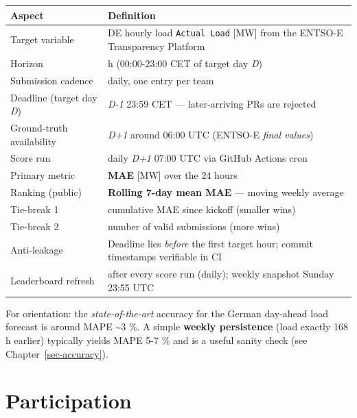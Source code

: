 \documentclass[
  english,
  letterpaper,
]{scrbook}
\newcounter{none} %
\begin{document}
{\def\LTcaptype{none} %
\begin{longtable}[]{@{}
  >{\raggedright\arraybackslash}p{}
  >{\raggedright\arraybackslash}p{}@{}}
\toprule\noalign{}
\begin{minipage}[b]{\linewidth}\raggedright
Aspect
\end{minipage} & \begin{minipage}[b]{\linewidth}\raggedright
Definition
\end{minipage} \\
\midrule\noalign{}
\endhead
\bottomrule\noalign{}
\endlastfoot
Target variable & DE hourly load \texttt{Actual\ Load} {[}MW{]} from the
ENTSO-E Transparency Platform \\
Horizon & 24 h (00:00-23:00 CET of target day \emph{D}) \\
Submission cadence & daily, one entry per team \\
Deadline (target day \emph{D}) & \emph{D-1} 23:59 CET --- later-arriving
PRs are rejected \\
Ground-truth availability & \emph{D+1} around 06:00 UTC (ENTSO-E
\emph{final values}) \\
Score run & daily \emph{D+1} 07:00 UTC via GitHub Actions cron \\
Primary metric & \textbf{MAE} {[}MW{]} over the 24 hours \\
Ranking (public) & \textbf{Rolling 7-day mean MAE} --- moving weekly
average \\
Tie-break 1 & cumulative MAE since kickoff (smaller wins) \\
Tie-break 2 & number of valid submissions (more wins) \\
Anti-leakage & Deadline lies \emph{before} the first target hour; commit
timestamps verifiable in CI \\
Leaderboard refresh & after every score run (daily); weekly snapshot
Sunday 23:55 UTC \\
\end{longtable}
}

For orientation: the \emph{state-of-the-art} accuracy for the German
day-ahead load forecast is around MAPE \textasciitilde3 \%. A simple
\textbf{weekly persistence} (load exactly 168 h earlier) typically
yields MAPE 5-7 \% and is a useful sanity check (see
Chapter~\ref{sec-accuracy}).

\section{Participation}\label{participation}
\end{document}
